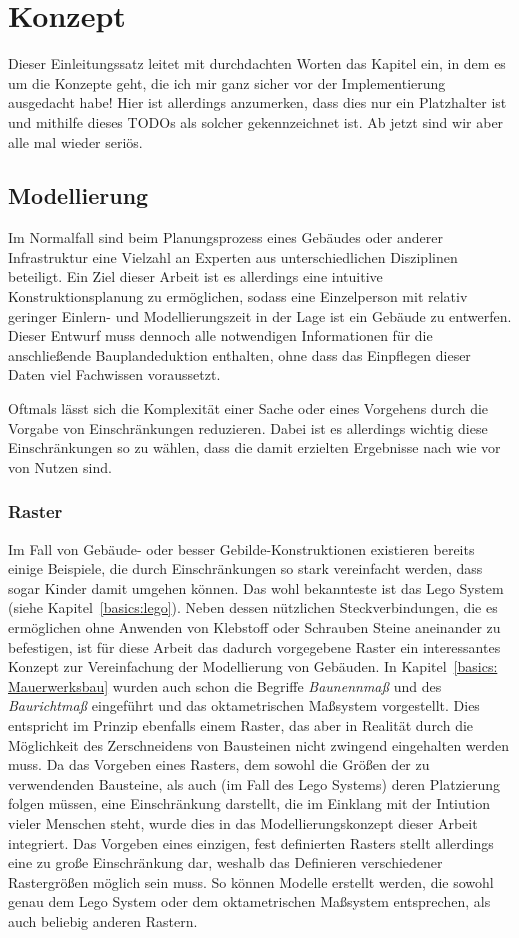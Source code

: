 \chapter{Konzept}
Dieser Einleitungssatz leitet mit durchdachten Worten das Kapitel ein, in dem es um die Konzepte geht, die ich mir ganz sicher vor der Implementierung ausgedacht habe!
Hier ist allerdings anzumerken, dass dies nur ein Platzhalter ist und mithilfe dieses TODOs als solcher gekennzeichnet ist.
Ab jetzt sind wir aber alle mal wieder seriös.

\section{Modellierung}
Im Normalfall sind beim Planungsprozess eines Gebäudes oder anderer Infrastruktur eine Vielzahl an Experten aus unterschiedlichen Disziplinen beteiligt.
Ein Ziel dieser Arbeit ist es allerdings eine intuitive Konstruktionsplanung zu ermöglichen, sodass eine Einzelperson mit relativ geringer Einlern- und Modellierungszeit in der Lage ist ein Gebäude zu entwerfen.
Dieser Entwurf muss dennoch alle notwendigen Informationen für die anschließende Bauplandeduktion enthalten, ohne dass das Einpflegen dieser Daten viel Fachwissen voraussetzt.

Oftmals lässt sich die Komplexität einer Sache oder eines Vorgehens durch die Vorgabe von Einschränkungen reduzieren.
Dabei ist es allerdings wichtig diese Einschränkungen so zu wählen, dass die damit erzielten Ergebnisse nach wie vor von Nutzen sind.

\subsection{Raster}
Im Fall von Gebäude- oder besser Gebilde-Konstruktionen existieren bereits einige Beispiele, die durch Einschränkungen so stark vereinfacht werden, dass sogar Kinder damit umgehen können.
Das wohl bekannteste ist das Lego System (siehe Kapitel~\ref{basics:lego}).
Neben dessen nützlichen Steckverbindungen, die es ermöglichen ohne Anwenden von Klebstoff oder Schrauben Steine aneinander zu befestigen, ist für diese Arbeit das dadurch vorgegebene Raster ein interessantes Konzept zur Vereinfachung der Modellierung von Gebäuden.
In Kapitel~\ref{basics: Mauerwerksbau} wurden auch schon die Begriffe \textit{Baunennmaß} und des \textit{Baurichtmaß} eingeführt und das oktametrischen Maßsystem vorgestellt.
Dies entspricht im Prinzip ebenfalls einem Raster, das aber in Realität durch die Möglichkeit des Zerschneidens von Bausteinen nicht zwingend eingehalten werden muss.
Da das Vorgeben eines Rasters, dem sowohl die Größen der zu verwendenden Bausteine, als auch (im Fall des Lego Systems) deren Platzierung folgen müssen, eine Einschränkung darstellt, die im Einklang mit der Intiution vieler Menschen steht, wurde dies in das Modellierungskonzept dieser Arbeit integriert.
Das Vorgeben eines einzigen, fest definierten Rasters stellt allerdings eine zu große Einschränkung dar, weshalb das Definieren verschiedener Rastergrößen möglich sein muss.
So können Modelle erstellt werden, die sowohl genau dem Lego System oder dem oktametrischen Maßsystem entsprechen, als auch beliebig anderen Rastern.


